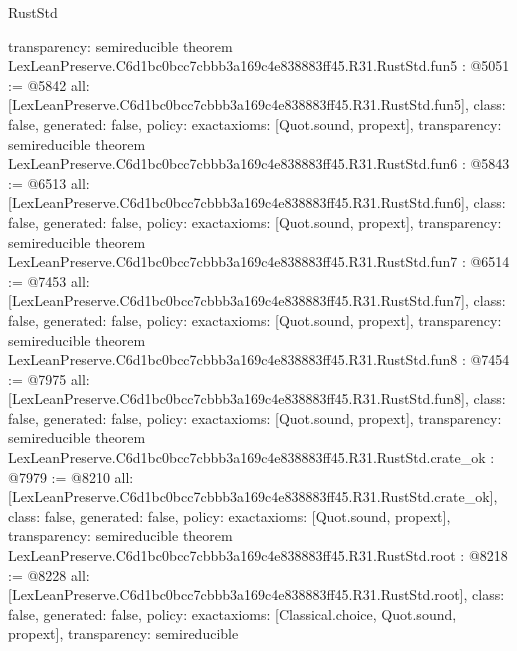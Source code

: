 \begin{lexlean}{RustStd}
\begin{coremodule}
{  transparency: semireducible
}
theorem LexLeanPreserve.C6d1bc0bcc7cbbb3a169c4e838883ff45.R31.RustStd.fun5 : @5051 := @5842 {
  all: [LexLeanPreserve.C6d1bc0bcc7cbbb3a169c4e838883ff45.R31.RustStd.fun5],
  class: false,
  generated: false,
  policy: exact{axioms: [Quot.sound, propext]},
  transparency: semireducible
}
theorem LexLeanPreserve.C6d1bc0bcc7cbbb3a169c4e838883ff45.R31.RustStd.fun6 : @5843 := @6513 {
  all: [LexLeanPreserve.C6d1bc0bcc7cbbb3a169c4e838883ff45.R31.RustStd.fun6],
  class: false,
  generated: false,
  policy: exact{axioms: [Quot.sound, propext]},
  transparency: semireducible
}
theorem LexLeanPreserve.C6d1bc0bcc7cbbb3a169c4e838883ff45.R31.RustStd.fun7 : @6514 := @7453 {
  all: [LexLeanPreserve.C6d1bc0bcc7cbbb3a169c4e838883ff45.R31.RustStd.fun7],
  class: false,
  generated: false,
  policy: exact{axioms: [Quot.sound, propext]},
  transparency: semireducible
}
theorem LexLeanPreserve.C6d1bc0bcc7cbbb3a169c4e838883ff45.R31.RustStd.fun8 : @7454 := @7975 {
  all: [LexLeanPreserve.C6d1bc0bcc7cbbb3a169c4e838883ff45.R31.RustStd.fun8],
  class: false,
  generated: false,
  policy: exact{axioms: [Quot.sound, propext]},
  transparency: semireducible
}
theorem LexLeanPreserve.C6d1bc0bcc7cbbb3a169c4e838883ff45.R31.RustStd.crate_ok : @7979 := @8210 {
  all: [LexLeanPreserve.C6d1bc0bcc7cbbb3a169c4e838883ff45.R31.RustStd.crate_ok],
  class: false,
  generated: false,
  policy: exact{axioms: [Quot.sound, propext]},
  transparency: semireducible
}
theorem LexLeanPreserve.C6d1bc0bcc7cbbb3a169c4e838883ff45.R31.RustStd.root : @8218 := @8228 {
  all: [LexLeanPreserve.C6d1bc0bcc7cbbb3a169c4e838883ff45.R31.RustStd.root],
  class: false,
  generated: false,
  policy: exact{axioms: [Classical.choice, Quot.sound, propext]},
  transparency: semireducible
}


\end{coremodule}
\end{lexlean}
